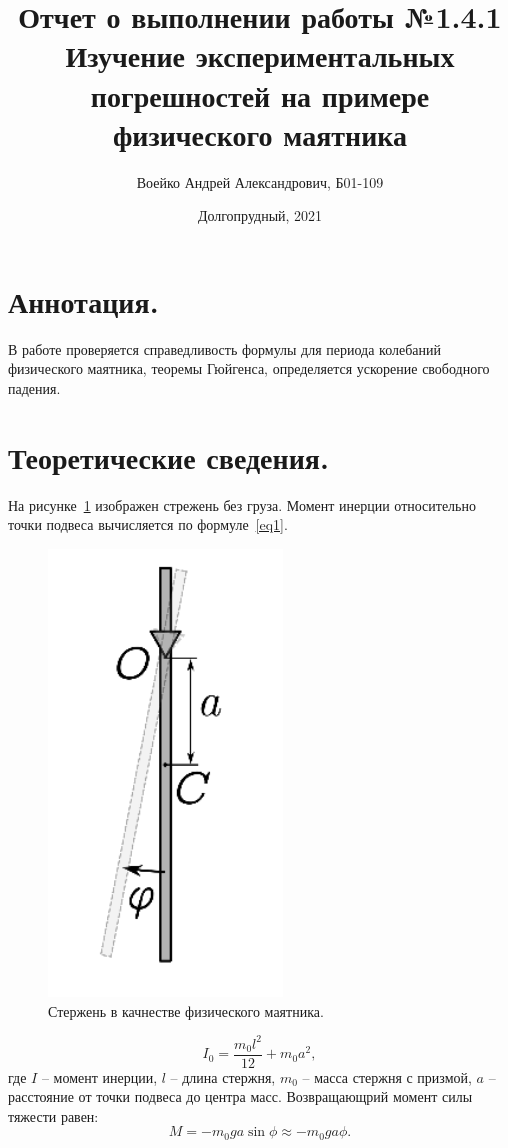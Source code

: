\documentclass[a4paper,11pt]{article}
\title{Отчет о выполнении работы №1.4.1\\Изучение экспериментальных погрешностей на примере физического маятника}
\author{Воейко Андрей Александрович, Б01-109}
\date{Долгопрудный, 2021}
\begin{document}
\maketitle
\newpage
\section{Аннотация.}
В работе проверяется справедливость формулы для периода колебаний физического маятника, теоремы Гюйгенса, определяется ускорение свободного падения.
\section{Теоретические сведения.}
На рисунке~\ref{fig:img1} изображен стрежень без груза. Момент инерции относительно точки подвеса вычисляется по формуле~\ref{eq1}.
\begin{figure}
  \includegraphics[scale = 0.75]{pic1.png}
  \caption{Стержень в качнестве физического маятника.}
  \label{fig:img1}
\end{figure}
\begin{equation}    \label{eq1}
  I_{0} = \frac{m_{0}l^{2}}{12} + m_{0}a^{2},
\end{equation}
где $I$ -- момент инерции, $l$ -- длина стержня, $m_{0}$ -- масса стержня с призмой, $a$ -- расстояние от точки подвеса до центра масс.\newline
Возвращающрий момент силы тяжести равен:
\begin{equation}    \label{eq2}
  M = -m_{0}g a \sin{\phi} \approx -m_{0}g a \phi.
\end{equation}
\end{document}

